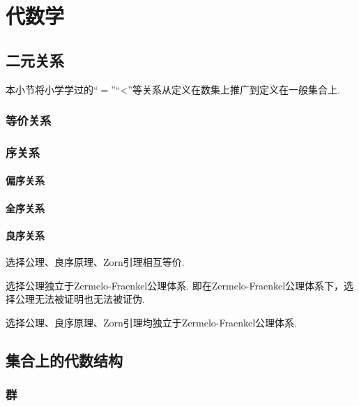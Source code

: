 \chapter{代数学}

\section{二元关系}
本小节将小学学过的“$=$”“<”等关系从定义在数集上推广到定义在一般集合上.
\subsection{等价关系}

\subsection{序关系}
\subsubsection{偏序关系}
\subsubsection{全序关系}
\subsubsection{良序关系}
\begin{axiom}[良序原理]
    
\end{axiom}
\begin{axiom}[Zorn引理]
    
\end{axiom}
\begin{theorem}
    选择公理、良序原理、Zorn引理相互等价.
\end{theorem}
\begin{theorem}
    选择公理独立于Zermelo-Fraenkel公理体系. 即在Zermelo-Fraenkel公理体系下，选择公理无法被证明也无法被证伪.
\end{theorem}
\begin{corollary}
    选择公理、良序原理、Zorn引理均独立于Zermelo-Fraenkel公理体系.
\end{corollary}


\section{集合上的代数结构}

\subsection{群}
